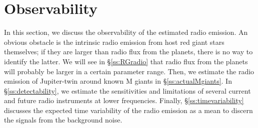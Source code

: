 \documentclass{emulateapj}
\def\plotonesc#1{\centering \leavevmode
\texttt{[image: \#1]}}
\begin{document}

\section{Observability}
\label{s:observability}

In this section, we discuss the observability of the estimated radio emission. 
An obvious obstacle is the intrinsic radio emission from host red giant stars themselves; if they are larger than radio flux from the planets, there is no way to identify the latter. We will see in \S\ref{ss:RGradio} that radio flux from the planets will probably be larger in a certain parameter range. 
Then, we estimate the radio emission of Jupiter-twin around known M giants in \S\ref{ss:actualMgiants}. 
In \S\ref{ss:detectability}, we estimate the sensitivities and limitations of several current and future
radio instruments at lower frequencies.
Finally, \S\ref{ss:timevariability} discusses the expected time variability of the radio emission as a mean to discern the signals from the background noise. 
\end{document}
